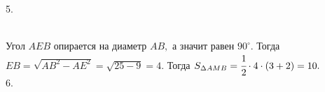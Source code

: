 \documentclass[12pt]{article}
\begin{document}
5. \begin{figure}[ht!]
\end{figure}\\
Угол $AEB$ опирается на диаметр $AB,$ а значит равен $90^\circ.$ Тогда $EB=\sqrt{AB^2-AE^2}=\sqrt{25-9}=4.$ Тогда $S_{\Delta AMB}=\cfrac{1}{2}\cdot4\cdot (3+2)=10.$\\
6. \begin{figure}[ht!]
\end{figure}\\
\end{document}
